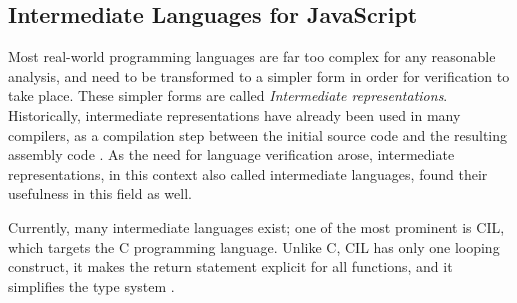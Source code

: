 \documentclass[a4paper,11pt,twoside]{report}
\begin{document}
\subsection{Intermediate Languages for JavaScript}\label{sec:ir}
Most real-world programming languages are far too complex for any reasonable analysis, and need to be transformed to a simpler form in order for verification to take place. These simpler forms are called {\em Intermediate representations}. Historically, intermediate representations have already been used in many compilers, as a compilation step between the initial source code and the resulting assembly code \cite{Necula2002}. As the need for language verification arose, intermediate representations, in this context also called intermediate languages, found their usefulness in this field as well.

Currently, many intermediate languages exist; one of the most prominent is CIL, which targets the C programming language. Unlike C, CIL has only one looping construct, it makes the return statement explicit for all functions, and it simplifies the type system \cite{Necula2002}.
\end{document}
